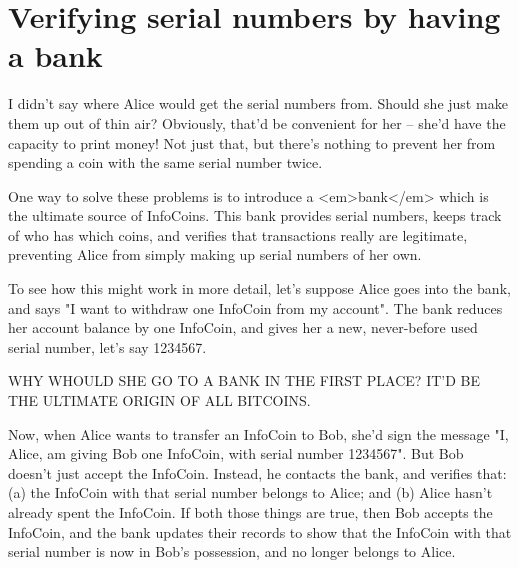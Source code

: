 \documentclass[12pt]{book}
\newcounter{problem}[chapter]
\begin{document}
\section{Verifying serial numbers by having a bank}

I didn't say where Alice would get the serial numbers from.  Should
she just make them up out of thin air?  Obviously, that'd be
convenient for her -- she'd have the capacity to print money!  Not
just that, but there's nothing to prevent her from spending a coin
with the same serial number twice.

One way to solve these problems is to introduce a <em>bank</em> which
is the ultimate source of InfoCoins.  This bank provides serial
numbers, keeps track of who has which coins, and verifies that
transactions really are legitimate, preventing Alice from simply
making up serial numbers of her own.

To see how this might work in more detail, let's suppose Alice goes
into the bank, and says "I want to withdraw one InfoCoin from my
account".  The bank reduces her account balance by one InfoCoin, and
gives her a new, never-before used serial number, let's say 1234567.

WHY WHOULD SHE GO TO A BANK IN THE FIRST PLACE?  IT'D BE THE ULTIMATE
ORIGIN OF ALL BITCOINS.

Now, when Alice wants to transfer an InfoCoin to Bob, she'd sign the
message "I, Alice, am giving Bob one InfoCoin, with serial number
1234567".  But Bob doesn't just accept the InfoCoin.  Instead, he
contacts the bank, and verifies that: (a) the InfoCoin with that
serial number belongs to Alice; and (b) Alice hasn't already spent the
InfoCoin.  If both those things are true, then Bob accepts the
InfoCoin, and the bank updates their records to show that the InfoCoin
with that serial number is now in Bob's possession, and no longer
belongs to Alice.
\end{document}

